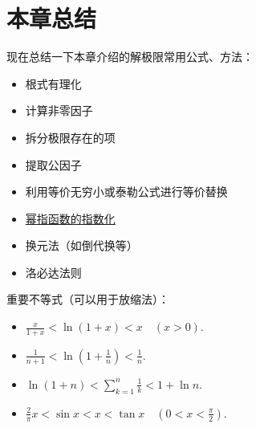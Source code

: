 \section{本章总结}
现在总结一下本章介绍的解极限常用公式、方法：
\begin{itemize}
	\item 根式有理化
	\item 计算非零因子
	\item 拆分极限存在的项
	\item 提取公因子
	\item 利用等价无穷小或泰勒公式进行等价替换
	\item \hyperref[theorem:幂指函数.幂指函数的极限]{幂指函数的指数化}
	\item 换元法（如倒代换等）
	\item 洛必达法则
\end{itemize}

重要不等式（可以用于放缩法）：
\begin{itemize}
	\item \(\frac{x}{1+x} < \ln(1+x) < x \quad(x>0)\).%
	\item \(\frac1{n+1} < \ln(1+\frac1n) < \frac1n\).
	\item \(\ln(1+n) < \sum_{k=1}^n \frac1{k} < 1 + \ln n\).
	\item \(\frac2\pi x < \sin x < x < \tan x \quad(0<x<\frac\pi2)\).
\end{itemize}

